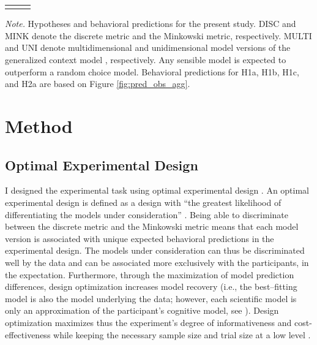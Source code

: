 \documentclass[a4paper,man,natbib]{apa6}
\begin{document}
\begin{table}
\begin{center}
\begin{threeparttable}
\begin{tabular*}{\textwidth}{lp{115mm}p{110mm}}
\bottomrule
\addlinespace
\end{tabular*}
\begin{tablenotes}[para]
\textit{Note.} Hypotheses and behavioral predictions for the present study. DISC and MINK denote the discrete metric and the Minkowski metric, respectively. MULTI and UNI denote multidimensional and unidimensional model versions of the generalized context model \citep{nosofsky1989further}, respectively. Any sensible model is expected to outperform a random choice model. Behavioral predictions for H1a, H1b, H1c, and H2a are based on Figure \ref{fig:pred_obs_agg}.
\end{tablenotes}
\end{threeparttable}
\end{center}
\end{table}
\vspace{\baselineskip}

\section{Method}

\subsection{Optimal Experimental Design}
I designed the experimental task using optimal experimental design \citep{myung2009optimal}. An optimal experimental design is defined as a design with ``the greatest likelihood of differentiating the models under consideration'' \cite[][p. 500]{myung2009optimal}. Being able to discriminate between the discrete metric and the Minkowski metric means that each model version is associated with unique expected behavioral predictions in the experimental design. The models under consideration can thus be discriminated well by the data and can be associated more exclusively with the participants, in the expectation. Furthermore, through the maximization of model prediction differences, design optimization increases model recovery (i.e., the best--fitting model is also the model underlying the data; however, each scientific model is only an approximation of the participant's cognitive model, see \citealp{myung2009optimal}). 
Design optimization maximizes thus the experiment's degree of informativeness and cost-effectiveness while keeping the necessary sample size and trial size at a low level \citep{cavagnaro2009better, ouyang2016practical, raffert2012optimally, atkinson2007optimum, nelson2005finding}. 
\end{document}
